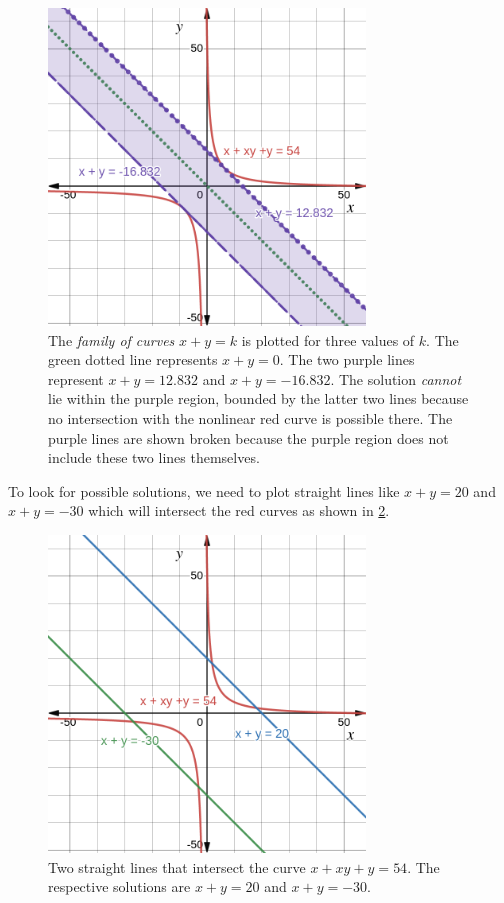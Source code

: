 \documentclass[
  a4paper,
]{article}
\begin{document}
\begin{figure}
\hypertarget{fig:two}{%
\centering
\includegraphics[width=0.75\textwidth,height=\textheight]{images/olympiad-two.png}
\caption{The \emph{family of curves} \(x + y = k\) is plotted for three
values of \(k\). The green dotted line represents \(x + y = 0\). The two
purple lines represent \(x + y = 12.832\) and \(x + y = -16.832\). The
solution \emph{cannot} lie within the purple region, bounded by the
latter two lines because no intersection with the nonlinear red curve is
possible there. The purple lines are shown broken because the purple
region does not include these two lines themselves.}\label{fig:two}
}
\end{figure}

To look for possible solutions, we need to plot straight lines like
\(x + y = 20\) and \(x + y = -30\) which will intersect the red curves
as shown in \cref{fig:three}.

\begin{figure}
\hypertarget{fig:three}{%
\centering
\includegraphics[width=0.75\textwidth,height=\textheight]{images/olympiad-three.png}
\caption{Two straight lines that intersect the curve
\(x + xy + y = 54\). The respective solutions are \(x + y = 20\) and
\(x + y = -30\).}\label{fig:three}
}
\end{figure}
\end{document}
